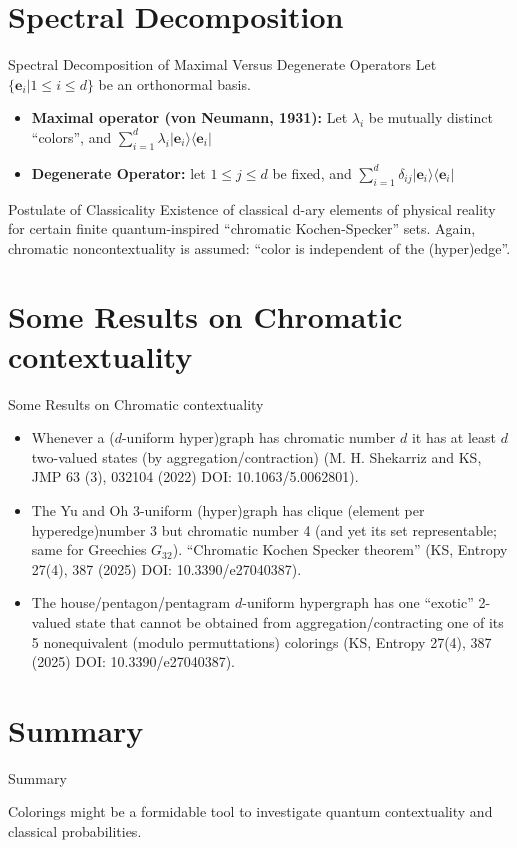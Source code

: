 \documentclass{beamer}
\begin{document}
\section{Spectral Decomposition}
\begin{frame}{Spectral Decomposition of Maximal Versus Degenerate Operators}
Let $\{\mathbf{e}_i \vert 1 \le i \le d\}$ be an orthonormal basis.
\begin{itemize}
        \item \textbf{Maximal operator (von Neumann, 1931):}
Let  $\lambda_i$ be mutually distinct ``colors'', and
$\sum_{i=1}^d \lambda_i \vert \mathbf{e}_i \rangle \langle \mathbf{e}_i\vert$
        \item \textbf{Degenerate Operator:} let $1 \le j \le d$ be fixed, and
$\sum_{i=1}^d \delta_{ij} \vert \mathbf{e}_i \rangle \langle \mathbf{e}_i\vert$
    \end{itemize}
    \pause
\begin{block}{Postulate of Classicality}
Existence of classical d-ary elements of physical reality for certain finite quantum-inspired ``chromatic Kochen-Specker'' sets.
Again, chromatic noncontextuality is assumed: ``color is independent of the (hyper)edge''.
\end{block}
\end{frame}

\section{Some Results on Chromatic contextuality}
\begin{frame}{Some Results on Chromatic contextuality}

\begin{itemize}
        \item Whenever a ($d$-uniform hyper)graph has chromatic number $d$ it has at least $d$ two-valued states (by aggregation/contraction)
(M. H. Shekarriz and KS, JMP 63 (3), 032104 (2022) DOI: 10.1063/5.0062801).
        \item The Yu and Oh 3-uniform (hyper)graph has clique (element per hyperedge)number 3 but chromatic number 4 (and yet its set representable; same for Greechies $G_{32}$).
``Chromatic  Kochen Specker theorem'' (KS, Entropy 27(4), 387 (2025) DOI: 10.3390/e27040387).
        \item The house/pentagon/pentagram $d$-uniform hypergraph has one ``exotic'' 2-valued state that cannot be obtained from aggregation/contracting one of its 5 nonequivalent (modulo permuttations) colorings
 (KS, Entropy 27(4), 387 (2025) DOI: 10.3390/e27040387).
    \end{itemize}
\end{frame}

\section{Summary}
\begin{frame}{Summary}

\alert{Colorings might be a formidable tool to investigate quantum contextuality and classical probabilities.}
\end{frame}
\end{document}
